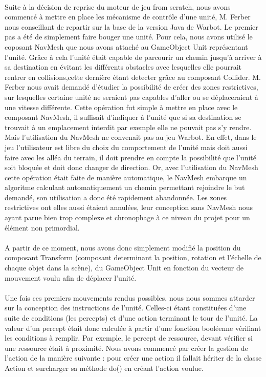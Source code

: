 \documentclass{report}
\begin{document}
\paragraph{}Suite à la décision de reprise du moteur de jeu from scratch, nous avons commencé à mettre en place les mécanisme de contrôle d'une unité, M. Ferber nous conseillant de repartir sur la base de la version Java de Warbot. Le premier pas a été de simplement faire bouger une unité. Pour cela, nous avons utilisé le coposant NavMesh que nous avons attaché au GameObject Unit représentant l'unité. Grâce à cela l'unité était capable de parcourir un chemin jusqu'à arriver à sa destination en évitant les différents obstacles avec lesquelles elle pourrait rentrer en collisions,cette dernière étant detecter grâce au composant Collider. M. Ferber nous avait demandé d'étudier la possibilité de créer des zones restrictives, sur lesquelles certaine unité ne seraient pas capables d'aller ou se déplaceraient à une vitesse différente. Cette opération fut simple à mettre en place avec le composant NavMesh, il suffisait d'indiquer à l'unité que si sa destination se trouvait à un emplacement interdit par exemple elle ne pouvait pas s'y rendre. Mais l'utilisation du NavMesh  ne convenait pas au jeu Warbot. En effet, dans le jeu l'utilisateur est libre du choix du comportement de l'unité mais doit aussi faire avec les alléa du terrain, il doit prendre en compte la possibilité que l'unité soit bloquée et doit donc changer de direction. Or, avec l'utilisation du NavMesh cette opération était faite de manière automatique, le NavMesh embarque un algoritme calculant automatiquement un chemin permettant rejoindre le but demandé, son utilisation a donc été rapidement abandonnée. Les zones restrictives ont elles aussi étaient annulées, leur conception sans NavMesh nous ayant parue bien trop complexe et chronophage à ce niveau du projet pour un élément non primordial. 
\paragraph{}A partir de ce moment, nous avons donc simplement modifié la position du composant Transform (composant determinant la position, rotation et l'échelle de chaque objet dans la scène), du GameObject Unit en fonction du vecteur de mouvement voulu afin de déplacer l'unité.
\paragraph{}Une fois ces premiers mouvements rendus possibles, nous nous sommes attarder sur la conception des instructions de l'unité. Celles-ci étant constituées d'une suite de conditions (les percepts) et d'une action terminant le tour de l'unité. La valeur d'un percept était donc calculée à partir d'une fonction booléenne vérifiant les conditions à remplir. Par exemple, le percept de ressource, devant vérifier si une ressource était à proximité. Nous avons commencé par créer la gestion de l'action de la manière suivante : pour créer une action il fallait hériter de la classe Action et surcharger sa méthode do() en créant l'action voulue.
\end{document}
